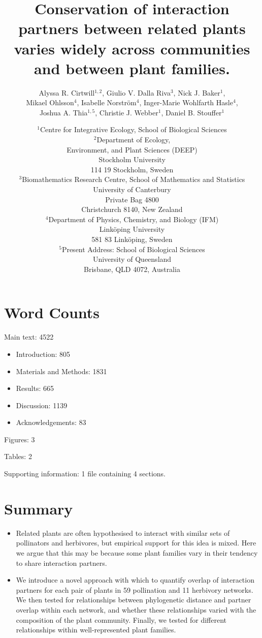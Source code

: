 \documentclass[12pt]{article}
\title{Conservation of interaction partners between related plants varies widely across communities and between plant families.}
\author{Alyssa R. Cirtwill$^{1,2}$, Giulio V. Dalla Riva$^{3}$, Nick J. Baker$^{1}$,\\
Mikael Ohlsson$^{4}$, Isabelle Norstr\"{o}m$^{4}$, Inger-Marie Wohlfarth Hasle$^{4}$,\\
Joshua A. Thia$^{1,5}$, Christie J. Webber$^{1}$, Daniel B. Stouffer$^{1}$}
\date{\small$^1$Centre for Integrative Ecology, School of Biological Sciences\\
\medskip$^2$Department of Ecology,\\
Environment, and Plant Sciences (DEEP)\\
Stockholm University\\
114 19 Stockholm, Sweden\\
\medskip$^3$Biomathematics Research Centre, School of Mathematics and Statistics\\
University of Canterbury\\Private Bag 4800\\
Christchurch 8140, New Zealand\\
\medskip$^4$Department of Physics, Chemistry, and Biology (IFM)\\ Link\"{o}ping University\\ 581 83 Link\"{o}ping, Sweden\\
\medskip$^5$Present Address: School of Biological Sciences\\
University of Queensland\\Brisbane, QLD 4072, Australia }
\begin{document}
\maketitle
\baselineskip=8.5mm
\begin{spacing}{1.0}

\section*{Word Counts}

Main text: 4522

\begin{itemize}
  \item Introduction: 805 
  \item Materials and Methods: 1831 
  \item Results: 665
  \item Discussion: 1139 
  \item Acknowledgements: 83
\end{itemize}



Figures: 3


Tables: 2


Supporting information: 1 file containing 4 sections.


\vspace{0.4 in}

\section*{Summary}

  \begin{itemize}
    \item Related plants are often hypothesised to interact with similar sets of 
          pollinators and herbivores, but empirical support for this idea is mixed.
          Here we argue that this may be because some plant families vary in their 
          tendency to share interaction partners.

    \item We introduce a novel approach with which to quantify
          overlap of interaction
          partners for each pair of plants in 59 pollination and 11 herbivory
          networks.  We then tested for relationships between phylogenetic 
          distance and partner overlap within each network, and whether these 
          relationships varied with the composition of the plant community.
          Finally, we tested for different relationships within well-represented
          plant families.


\end{itemize}
\end{spacing}
\end{document}
